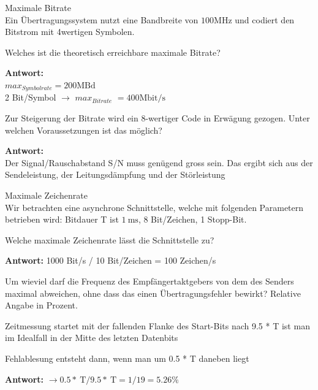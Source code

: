 \begin{example2}{Maximale Bitrate}\\
 Ein Übertragungssystem nutzt eine Bandbreite von $100 \mathrm{MHz}$ und codiert den Bitstrom mit 4wertigen Symbolen.

 Welches ist die theoretisch erreichbare maximale Bitrate?

\textbf{Antwort:}\\
$max_{Symbolrate} =200 \mathrm{MBd}$\\
2 Bit/Symbol $\rightarrow$ $max_{Bitrate}$ $=400 \mathrm{Mbit} / \mathrm{s}$

\vspace{2mm}

Zur Steigerung der Bitrate wird ein 8-wertiger Code in Erwägung gezogen. Unter welchen Voraussetzungen ist das möglich?

\textbf{Antwort:}\\
Der Signal/Rauschabstand S/N muss genügend gross sein. Das ergibt sich aus der Sendeleistung, der Leitungsdämpfung und der Störleistung
\end{example2}
\begin{example2}{Maximale Zeichenrate}\\
Wir betrachten eine asynchrone Schnittstelle, welche mit folgenden Parametern betrieben wird: Bitdauer T ist $1 \mathrm{~ms}$, 8 Bit/Zeichen, 1 Stopp-Bit.

Welche maximale Zeichenrate lässt die Schnittstelle zu?

\textbf{Antwort:}
1000 Bit/s / 10 Bit/Zeichen = 100 Zeichen/s

Um wieviel darf die Frequenz des Empfängertaktgebers von dem des Senders maximal abweichen, ohne dass das einen Übertragungsfehler bewirkt? Relative Angabe in Prozent.

Zeitmessung startet mit der fallenden Flanke des Start-Bits nach 9.5 * T ist man im Idealfall in der Mitte des letzten Datenbits

Fehlablesung entsteht dann, wenn man um 0.5 * T daneben liegt

\textbf{Antwort:}
$\rightarrow 0.5 * \mathrm{~T} / 9.5 * \mathrm{~T}=1 / 19=5.26 \%$
\end{example2}

